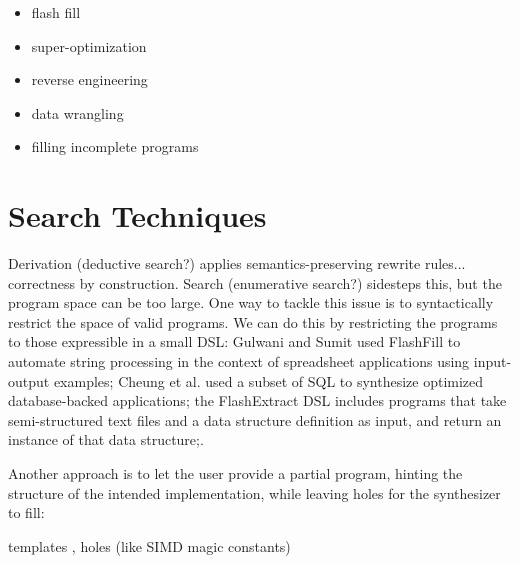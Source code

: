 \begin{itemize}
\item flash fill
\item super-optimization
\item reverse engineering
\item data wrangling
\item filling incomplete programs
\end{itemize}

\section{Search Techniques}
\label{sec:search-techniques}

 Derivation (deductive search?) applies
semantics-preserving rewrite rules... correctness by construction.
Search (enumerative search?) sidesteps this, but the program space can be too large.
One way to tackle this issue is to syntactically restrict the space of valid
programs. We can do this by restricting the programs to those expressible in a
small DSL:
 Gulwani and Sumit \cite{Gulwani:2011}
used FlashFill to automate string processing in the context of spreadsheet
applications using input-output examples;
Cheung et al. \cite{Cheung:2013} used a subset of SQL to synthesize optimized
database-backed applications;
the FlashExtract DSL \cite{Le:2014} includes programs that take semi-structured
text files and a data structure definition as input, and return an instance of
that data structure;.

Another approach is to let the user provide a partial program, hinting the
structure of the intended implementation, while leaving holes for the
synthesizer to fill:

templates \cite{Srivastava:2012},
holes (like SIMD magic constants) \cite{Solar-Lezama:2008}


